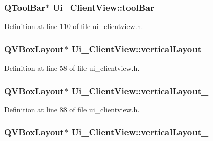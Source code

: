 \hypertarget{class_ui___client_view_af7e90f55cbfb0bd6caea82561e555d0a}{}
\subsubsection[{tool\+Bar}]{\setlength{\rightskip}{0pt plus 5cm}Q\+Tool\+Bar$\ast$ Ui\+\_\+\+Client\+View\+::tool\+Bar}\label{class_ui___client_view_af7e90f55cbfb0bd6caea82561e555d0a}


Definition at line 110 of file ui\+\_\+clientview.\+h.

\hypertarget{class_ui___client_view_a6df61dc527c8a16c99264dc76664a0e7}{}
\subsubsection[{vertical\+Layout}]{\setlength{\rightskip}{0pt plus 5cm}Q\+V\+Box\+Layout$\ast$ Ui\+\_\+\+Client\+View\+::vertical\+Layout}\label{class_ui___client_view_a6df61dc527c8a16c99264dc76664a0e7}


Definition at line 58 of file ui\+\_\+clientview.\+h.

\hypertarget{class_ui___client_view_ad5ce2749c87f255604291402d313c2e2}{}
\subsubsection[{vertical\+Layout\+\_\+10}]{\setlength{\rightskip}{0pt plus 5cm}Q\+V\+Box\+Layout$\ast$ Ui\+\_\+\+Client\+View\+::vertical\+Layout\+\_}\label{class_ui___client_view_ad5ce2749c87f255604291402d313c2e2}


Definition at line 88 of file ui\+\_\+clientview.\+h.

\hypertarget{class_ui___client_view_a706af0a833f04cec36051a3924174306}{}
\subsubsection[{vertical\+Layout\+\_\+11}]{\setlength{\rightskip}{0pt plus 5cm}Q\+V\+Box\+Layout$\ast$ Ui\+\_\+\+Client\+View\+::vertical\+Layout\+\_}\label{class_ui___client_view_a706af0a833f04cec36051a3924174306}



